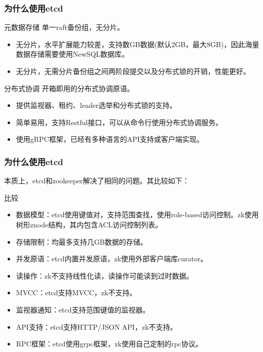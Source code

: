 \documentclass{beamer}
\begin{document}
%
%
\begin{frame}
\frametitle{为什么使用etcd}

\begin{exampleblock}{元数据存储}
单一raft备份组，无分片。
\begin{itemize}
    \item 无分片，水平扩展能力较差，支持数GB数据(默认2GB，最大8GB)，因此海量数据存储需要使用NewSQL数据库。
    \item 无分片，无需分片备份组之间两阶段提交以及分布式锁的开销，性能更好。
\end{itemize}
\end{exampleblock}

\begin{exampleblock}{分布式协调}
开箱即用的分布式协调原语。
\begin{itemize}
    \item 提供监视器、租约、leader选举和分布式锁的支持。
    \item 简单易用，支持Restful接口，可以从命令行使用分布式协调服务。
    \item 使用gRPC框架，已经有多种语言的API支持或客户端实现。
\end{itemize}
\end{exampleblock}

\end{frame}

%
%
\begin{frame}
\frametitle{为什么使用etcd}

本质上，etcd和zookeeper解决了相同的问题。其比较如下：

\begin{alertblock}{比较}
    \begin{itemize}
        \item 数据模型：etcd使用键值对，支持范围查找，使用role-based访问控制。zk使用树形znode结构，其内包含ACL访问控制列表。
        \item 存储限制：均最多支持几GB数据的存储。
        \item 并发原语：etcd内置并发原语，zk使用外部客户端库curator。
        \item 读操作：zk不支持线性化读，读操作可能读到过时数据。
        \item MVCC：etcd支持MVCC，zk不支持。
        \item 监视器通知：etcd支持范围键值的监视器。
        \item API支持：etcd支持HTTP/JSON API，zk不支持。
        \item RPC框架：etcd使用grpc框架，zk使用自己定制的rpc协议。
    \end{itemize}
\end{alertblock}

\end{frame}
\end{document}
